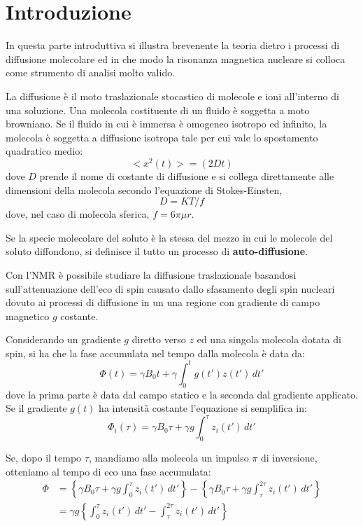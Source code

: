 \section*{Introduzione}

In questa parte introduttiva si illustra brevenente la teoria dietro i processi di diffusione molecolare ed in che modo la risonanza magnetica nucleare si colloca come strumento di analisi molto valido.

La diffusione è il moto traslazionale stocastico di molecole e ioni all'interno di una soluzione. Una molecola costituente di un fluido è soggetta a moto browniano. Se il fluido in cui è immersa è omogeneo isotropo ed infinito, la molecola è soggetta a diffusione isotropa tale per cui vale lo spostamento quadratico medio:
\begin{equation}
	<x^2(t)> = (2Dt)
\end{equation}
dove $D$ prende il nome di costante di diffusione e si collega direttamente alle dimensioni della molecola secondo l'equazione di Stokes-Einsten,
\begin{equation}
	D = KT/f
\end{equation}
dove, nel caso di molecola sferica, $f = 6\pi\mu r$.

Se la specie molecolare del soluto è la stessa del mezzo in cui le molecole del soluto diffondono, si definisce il tutto un processo di \textbf{auto-diffusione}.

Con l'NMR è possibile studiare la diffusione traslazionale basandosi sull'attenuazione dell'eco di spin causato dallo sfasamento degli spin nucleari dovuto ai processi di diffusione in un una regione con gradiente di campo magnetico $g$ costante.

Considerando un gradiente $g$ diretto verso $z$ ed una singola molecola dotata di spin, si ha che la fase accumulata nel tempo dalla molecola è data da:
\begin{equation}
	\Phi(t) = \gamma B_0 t + \gamma \int_0^t g(t')z(t')\,dt'
\end{equation}
dove la prima parte è data dal campo statico e la seconda dal gradiente applicato. Se il gradiente $g(t)$ ha intensità costante l'equazione si semplifica in:
\begin{equation}
	\Phi_i(\tau) = \gamma B_0 \tau + \gamma g \int_{0}^{\tau}z_i(t')\,dt'
\end{equation}

Se, dopo il tempo $\tau$, mandiamo alla molecola un impulso $\pi$ di inversione, otteniamo al tempo di eco una fase accumulata:
\begin{align}
	\Phi &= \left\{ \gamma B_0 \tau + \gamma g \int_{0}^{\tau}z_i(t')\,dt'\right\} - \left\{ \gamma B_0 \tau + \gamma g \int_{\tau}^{2\tau}z_i(t')\,dt'\right\} \\
	&= \gamma g \left\{ \int_{0}^{\tau}z_i(t')\,dt' - \int_{\tau}^{2\tau}z_i(t')\,dt' \right\}
\end{align}

